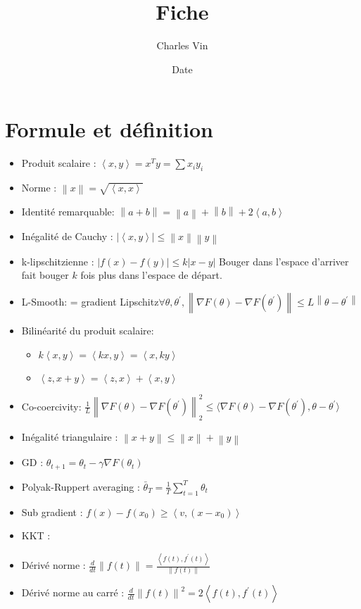 \documentclass{article}
\title{Fiche}
\author{Charles Vin}
\date{Date}
\theoremstyle{plain}%
\theoremstyle{definition}
\theoremstyle{remark}
\begin{document}
\maketitle

\section{Formule et définition}
\begin{itemize}
    \item Produit scalaire : $ \left\langle x, y \right\rangle = x^T y = \sum x_i y_i $ 
    \item Norme : $ \left\| x \right\| = \sqrt{\left\langle x,x \right\rangle } $ 
    \item Identité remarquable: $ \left\| a + b \right\| = \left\| a \right\| + \left\| b \right\| + 2 \left\langle a,b \right\rangle  $ 
    \item Inégalité de Cauchy : $ \left| \left\langle x,y \right\rangle  \right| \leq \left\| x \right\| \left\| y \right\|   $ 
    \item k-lipschitzienne : $ \left| f(x) - f(y) \right| \leq k \left| x - y \right|  $ Bouger dans l'espace d'arriver fait bouger $ k $ fois plus dans l'espace de départ.
    \item L-Smooth: = gradient Lipschitz$ \forall \theta , \theta ^\prime, \left\| \nabla F(\theta ) - \nabla F(\theta ^\prime ) \right\| \leq  L \left\| \theta - \theta ^\prime  \right\| $ 
    \item Bilinéarité du produit scalaire: \begin{itemize}
        \item $ k \left\langle x, y \right\rangle = \left\langle kx, y \right\rangle = \left\langle x ,ky \right\rangle  $ 
        \item $ \left\langle z, x + y \right\rangle = \left\langle z,x \right\rangle + \left\langle x,y \right\rangle  $ 
    \end{itemize}
    \item Co-coercivity: $ \frac{1}{L} \left\| \nabla F(\theta ) - \nabla F(\theta ^\prime ) \right\| ^2 _2 \leq  \langle  \nabla F(\theta ) - \nabla F(\theta ^\prime ), \theta  - \theta ^\prime \rangle$ 
    \item Inégalité triangulaire : $ \left\| x + y \right\| \leq \left\| x \right\| + \left\| y \right\|  $ 
    \item GD : $ \theta _{t+1} = \theta _t - \gamma \nabla F(\theta _t) $ 
    \item Polyak-Ruppert averaging : $ \bar{\theta }_T = \frac{1}{T} \sum_{t=1}^{T}\theta _t $ 
    \item Sub gradient : $ f(x) - f(x_0) \geq \left\langle v, (x - x_0) \right\rangle  $ 
    \item KKT : 
    \item Dérivé norme : $ \frac{d}{dt} \left\| f(t) \right\| = \frac{\left\langle f(t) , f^\prime (t) \right\rangle }{\left\| f(t) \right\| } $ 
    \item Dérivé norme au carré : $ \frac{d}{dt} \left\| f(t) \right\| ^2 = 2 \left\langle f(t) , f^\prime (t) \right\rangle $


\end{itemize}
\end{document}
